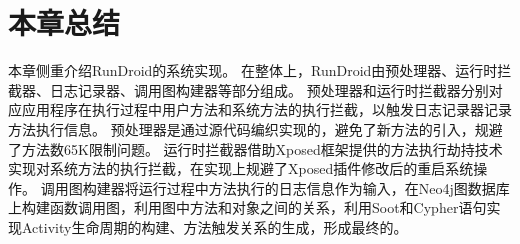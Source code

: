  \section{本章总结}

本章侧重介绍RunDroid的系统实现。
在整体上，RunDroid由预处理器、运行时拦截器、日志记录器、调用图构建器等部分组成。
预处理器和运行时拦截器分别对应应用程序在执行过程中用户方法和系统方法的执行拦截，以触发日志记录器记录方法执行信息。
预处理器是通过源代码编织实现的，避免了新方法的引入，规避了方法数65K限制问题。
运行时拦截器借助Xposed框架提供的方法执行劫持技术实现对系统方法的执行拦截，在实现上规避了Xposed插件修改后的重启系统操作。
调用图构建器将运行过程中方法执行的日志信息作为输入，在Neo4j图数据库上构建函数调用图，利用图中方法和对象之间的关系，利用Soot和Cypher语句实现Activity生命周期的构建、方法触发关系的生成，形成最终的\ecg。
